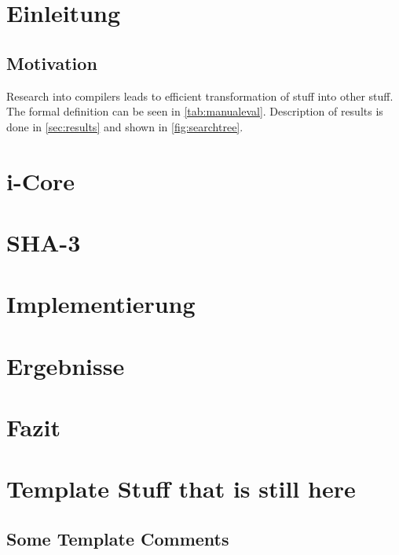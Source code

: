 \chapter{Einleitung}
\label{sec:Einleitung}


\section{Motivation}
\label{sec:motivation}
Research into compilers leads to efficient transformation of stuff into other stuff.
The formal definition can be seen in \cref{tab:manualeval}.
Description of results is done in \cref{sec:results} and shown in \cref{fig:searchtree}.

\chapter{i-Core}

\chapter{SHA-3}

\chapter{Implementierung}
\label{sec:first_iteration}




\chapter{Ergebnisse}

\chapter{Fazit}

\chapter{Template Stuff that is still here}

\section{Some Template Comments}
\label{sec:comments}

